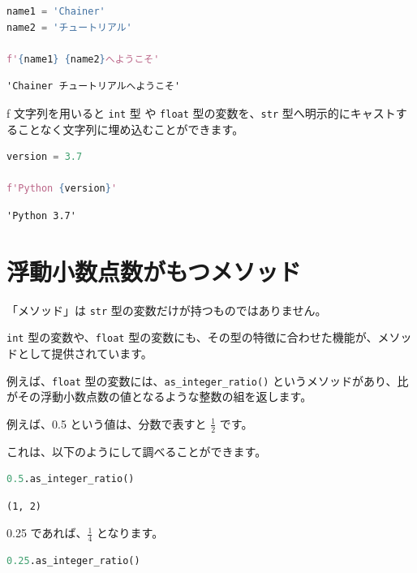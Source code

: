 \begin{lstlisting}[style=codecell,language=Python]
name1 = 'Chainer'
name2 = 'チュートリアル'

f'{name1} {name2}へようこそ'
\end{lstlisting}

\begin{lstlisting}[style=outputcell]
'Chainer チュートリアルへようこそ'
\end{lstlisting}

f 文字列を用いると \texttt{int} 型 や \texttt{float} 型の変数を、\texttt{str} 型へ明示的にキャストすることなく文字列に埋め込むことができます。


\begin{lstlisting}[style=codecell,language=Python]
version = 3.7

f'Python {version}'
\end{lstlisting}

\begin{lstlisting}[style=outputcell]
'Python 3.7'
\end{lstlisting}

\section{浮動小数点数がもつメソッド}


「メソッド」は \texttt{str} 型の変数だけが持つものではありません。

\texttt{int} 型の変数や、\texttt{float} 型の変数にも、その型の特徴に合わせた機能が、メソッドとして提供されています。


例えば、\texttt{float} 型の変数には、\texttt{as\_integer\_ratio()} というメソッドがあり、比がその浮動小数点数の値となるような整数の組を返します。


例えば、0.5 という値は、分数で表すと $\frac{1}{2}$ です。

これは、以下のようにして調べることができます。


\begin{lstlisting}[style=codecell,language=Python]
0.5.as_integer_ratio()
\end{lstlisting}

\begin{lstlisting}[style=outputcell]
(1, 2)
\end{lstlisting}

0.25 であれば、$\frac{1}{4}$ となります。


\begin{lstlisting}[style=codecell,language=Python]
0.25.as_integer_ratio()
\end{lstlisting}

